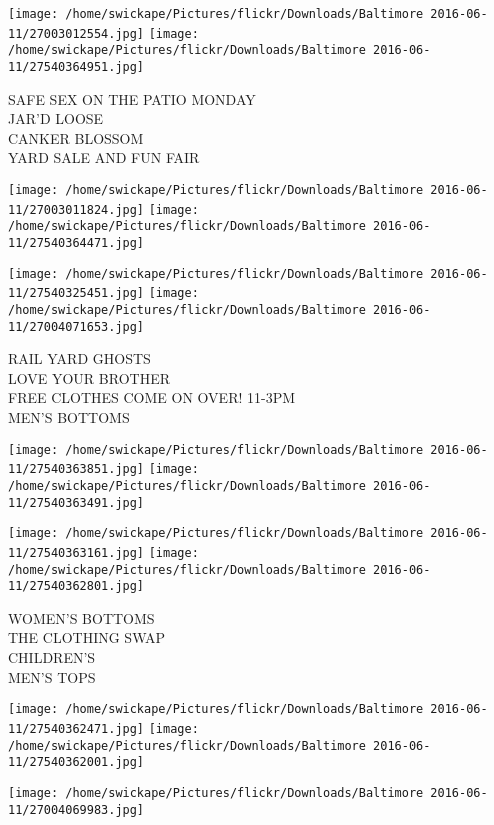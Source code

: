 \documentclass[10pt,letterpaper]{article}
\begin{document}
\texttt{[image: /home/swickape/Pictures/flickr/Downloads/Baltimore 2016-06-11/27003012554.jpg]}
\texttt{[image: /home/swickape/Pictures/flickr/Downloads/Baltimore 2016-06-11/27540364951.jpg]}

SAFE SEX ON THE PATIO MONDAY\\
JAR'D LOOSE\\
CANKER BLOSSOM\\
YARD SALE AND FUN FAIR\\
\pagebreak

\texttt{[image: /home/swickape/Pictures/flickr/Downloads/Baltimore 2016-06-11/27003011824.jpg]}
\texttt{[image: /home/swickape/Pictures/flickr/Downloads/Baltimore 2016-06-11/27540364471.jpg]}

\texttt{[image: /home/swickape/Pictures/flickr/Downloads/Baltimore 2016-06-11/27540325451.jpg]}
\texttt{[image: /home/swickape/Pictures/flickr/Downloads/Baltimore 2016-06-11/27004071653.jpg]}

RAIL YARD GHOSTS\\
LOVE YOUR BROTHER\\
FREE CLOTHES COME ON OVER!  11{-}3PM\\
MEN'S BOTTOMS\\
\pagebreak

\texttt{[image: /home/swickape/Pictures/flickr/Downloads/Baltimore 2016-06-11/27540363851.jpg]}
\texttt{[image: /home/swickape/Pictures/flickr/Downloads/Baltimore 2016-06-11/27540363491.jpg]}

\texttt{[image: /home/swickape/Pictures/flickr/Downloads/Baltimore 2016-06-11/27540363161.jpg]}
\texttt{[image: /home/swickape/Pictures/flickr/Downloads/Baltimore 2016-06-11/27540362801.jpg]}

WOMEN'S BOTTOMS\\
THE CLOTHING SWAP\\
CHILDREN'S\\
MEN'S TOPS\\
\pagebreak

\texttt{[image: /home/swickape/Pictures/flickr/Downloads/Baltimore 2016-06-11/27540362471.jpg]}
\texttt{[image: /home/swickape/Pictures/flickr/Downloads/Baltimore 2016-06-11/27540362001.jpg]}

\texttt{[image: /home/swickape/Pictures/flickr/Downloads/Baltimore 2016-06-11/27004069983.jpg]}
\end{document}
